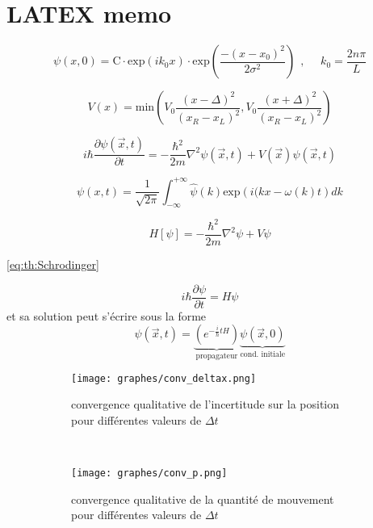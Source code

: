 \documentclass[a4paper,12pt,twoside]{article}
\begin{document}
\section{LATEX memo}
\begin{equation}
\psi(x,0) = \text{C}\cdot\text{exp}(ik_0x)\cdot\text{exp}\left( \frac{-(x-x_0)^2}{2\sigma^2} \right)   
~~, ~~~~~~k_0 = \frac{2 n\pi}{L}
\label{eq:th:OndeInitGauss}
\end{equation}

\begin{equation}
V(x) = \text{min}
\left( 
V_0\frac{\left( x-\Delta \right)^2}{\left( x_R - x_L \right)^2}  , 
V_0\frac{\left( x+\Delta \right)^2}{\left( x_R - x_L \right)^2}  
\right)
\label{eq:th:potentiel}
\end{equation}

\begin{equation}
i \hbar \frac{\partial \psi(\vec{x},t)}{\partial t}
=
-\frac{\hbar^2}{2m}\nabla^2\psi(\vec{x},t)
+
V(\vec{x})\psi(\vec{x},t)
\label{eq:th:Schrodinger}
\end{equation}

\begin{equation}
\psi(x,t) 
=
\frac{1}{\sqrt{2\pi}}
\int_{-\infty}^{+\infty}
\hat{\psi}(k)
\text{exp}\left( i(kx-\omega(k)t \right)
dk
\label{eq:th:Schrodinger:SolGen}
\end{equation}

\begin{equation}
H[\psi] = -\frac{\hbar^2}{2m}\nabla^2\psi + V\psi
\label{eq:Hamiltonien:Def}
\end{equation}

\ref{eq:th:Schrodinger}

\begin{equation}
i\hbar\frac{\partial \psi}{\partial t} = H\psi
\label{eq:th:Schrodinger:avecH}
\end{equation}
et sa solution peut s'écrire sous la forme
\begin{equation}
\psi(\vec{x},t) =
\underbrace{\left( e^{-\frac{i}{\hbar}tH} \right)}_\text{propagateur}
\underbrace{\psi(\vec{x}, 0)}_\text{cond. initiale}
\label{eq:th:Schrodinger:sol:avecH}
\end{equation}

\begin{figure}[h]
\centering
\begin{subfigure}[b]{0.48\textwidth}
		\texttt{[image: graphes/conv\_deltax.png]}
\caption{convergence qualitative de l'incertitude sur la position pour différentes valeurs de $\Delta t$}
\label{fig:convdeltax}
\end{subfigure}
~
\begin{subfigure}[b]{0.48\textwidth}
		\texttt{[image: graphes/conv\_p.png]}
				\caption{convergence qualitative de la quantité de mouvement pour différentes valeurs de $\Delta t$}
		\label{fig:convp}
\end{subfigure}


\caption{}
\label{fig:conv1}
\end{figure}
\end{document}
